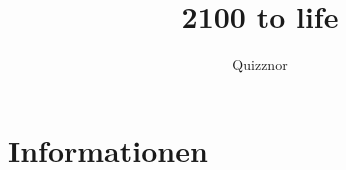 \documentclass{include/protokollclass}
\title{2100 to life}
\author{Quizznor}
\begin{document}
\maketitle
\tableofcontents

\chapter{Informationen}

\end{document}

